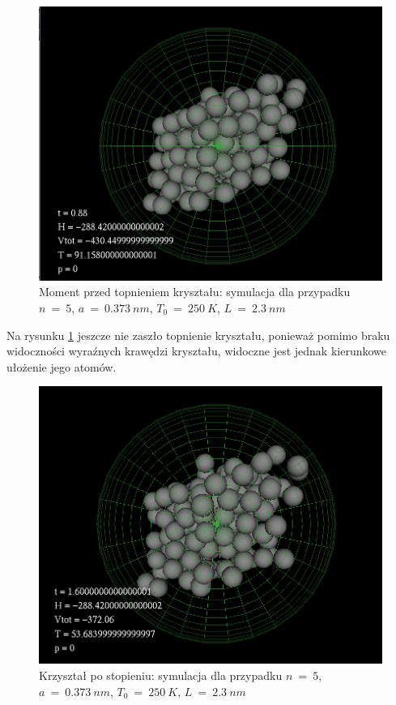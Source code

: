 \documentclass[10]{article}
\begin{document}
\begin{figure}[H]
\begin{center}
\includegraphics[scale=0.35]{struktura_250.png}
\caption{Moment przed topnieniem kryształu: symulacja dla przypadku $n~=~5$, $a~=~0.373~ nm$, $T_0 ~=~250~ K$, $L~=~2.3~nm$} \label{wykres:poczatek_top}
\end{center}
\end{figure}
Na rysunku \ref{wykres:poczatek_top} jeszcze nie zaszło topnienie kryształu, ponieważ pomimo braku widoczności wyraźnych krawędzi kryształu, widoczne jest jednak kierunkowe ułożenie jego atomów.


\begin{figure}[H]
\begin{center}
\includegraphics[scale=0.4]{temp_top_250.png}
\caption{Krzyształ po stopieniu: symulacja dla przypadku $n~=~5$, $a~=~0.373~ nm$, $T_0 ~=~250~ K$, $L~=~2.3~nm$} \label{wykres:topnienie}
\end{center}
\end{figure}
\end{document}
